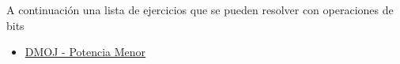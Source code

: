 A continuación una lista de ejercicios que se pueden resolver con operaciones de bits

\begin{itemize}
	\item \href{https://dmoj.uclv.edu.cu/problem/leastp}{DMOJ - Potencia Menor}
\end{itemize}